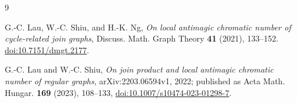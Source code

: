 \documentclass[11pt]{amsart}
\theoremstyle{remark}
\begin{document}
\begin{thebibliography}{9}

G.-C. Lau, W.-C. Shiu, and H.-K. Ng,
\emph{On local antimagic chromatic number of cycle-related join graphs},
Discuss. Math. Graph Theory \textbf{41} (2021), 133--152.
\href{https://doi.org/10.7151/dmgt.2177}{doi:10.7151/dmgt.2177}.

G.-C. Lau and W.-C. Shiu,
\emph{On join product and local antimagic chromatic number of regular graphs},
arXiv:2203.06594v1, 2022; published as
Acta Math. Hungar. \textbf{169} (2023), 108--133,
\href{https://doi.org/10.1007/s10474-023-01298-7}{doi:10.1007/s10474-023-01298-7}.

\end{thebibliography}
\end{document}
